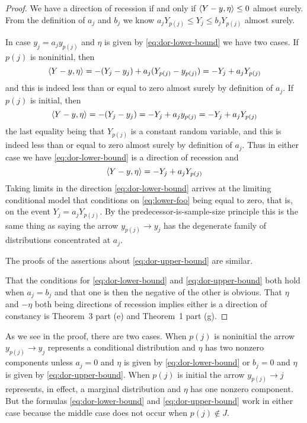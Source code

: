 \begin{proof}
We have a direction of recession if and only if $\langle Y - y, \eta \rangle \le 0$
almost surely.
From the definition
of $a_j$ and $b_j$ we know $a_j Y_{p(j)} \le Y_j \le b_j Y_{p(j)}$
almost surely.

In case $y_j = a_j y_{p(j)}$ and $\eta$ is
given by \eqref{eq:dor-lower-bound} we have two cases.
If $p(j)$ is noninitial, then
$$
   \langle Y - y, \eta \rangle = - (Y_j - y_j) + a_j (Y_{p(j)} - y_{p(j)})
   =
   - Y_j + a_j Y_{p(j)}
$$
and this is indeed less than or equal to zero almost surely by definition
of $a_j$.
If $p(j)$ is initial, then
$$
   \langle Y - y, \eta \rangle = - (Y_j - y_j)
   =
   - Y_j + a_j y_{p(j)}
   =
   - Y_j + a_j Y_{p(j)}
$$
the last equality being that $Y_{p(j)}$ is a constant random variable,
and this is indeed less than or equal to zero almost surely by definition
of $a_j$.  Thus in either case we have \eqref{eq:dor-lower-bound} is
a direction of recession and
\begin{equation} \label{eq:lower-foo}
   \langle Y - y, \eta \rangle = - Y_j + a_j Y_{p(j)}
\end{equation}
Taking limits in the direction \eqref{eq:dor-lower-bound} arrives at
the limiting conditional model that conditions
on \eqref{eq:lower-foo} being equal to zero, that is, on the event
$Y_j = a_j Y_{p(j)}$.  By the predecessor-is-sample-size principle
this is the same thing as saying the arrow
$y_{p(j)} \longrightarrow y_j$ has the degenerate family of distributions
concentrated at $a_j$.

The proofs of the assertions about \eqref{eq:dor-upper-bound} are similar.

That the conditions for \eqref{eq:dor-lower-bound}
and \eqref{eq:dor-upper-bound} both hold when $a_j = b_j$ and that
one is then the negative of the other is obvious.
That $\eta$ and $- \eta$ both being
directions of recession implies either is a direction of constancy is
\citet{geyer-gdor} Theorem~3 part (e) and Theorem~1 part (g).
\end{proof}
As we see in the proof, there are two cases.  When $p(j)$ is noninitial
the arrow $y_{p(j)} \longrightarrow y_j$ represents a conditional
distribution and $\eta$ has two nonzero components unless $a_j = 0$ and
$\eta$ is given by \eqref{eq:dor-lower-bound} or $b_j = 0$ and
$\eta$ is given by \eqref{eq:dor-upper-bound}.
When $p(j)$ is initial the arrow $y_{p(j)} \longrightarrow j$ represents,
in effect, a marginal distribution and $\eta$ has one nonzero component.
But the formulas \eqref{eq:dor-lower-bound} and \eqref{eq:dor-upper-bound}
work in either case because the middle case does not occur when
$p(j) \notin J$.

